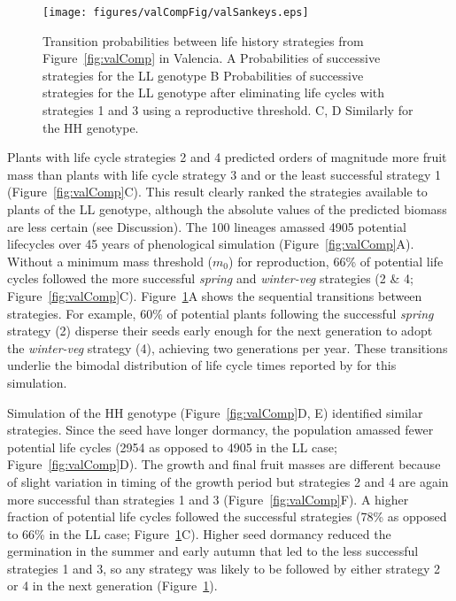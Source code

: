 \begin{figure}[tb]
\texttt{[image: figures/valCompFig/valSankeys.eps]}
\caption{Transition probabilities between life history strategies from
  Figure~\ref{fig:valComp} in Valencia. A Probabilities of successive strategies
  for the LL genotype B Probabilities of successive strategies for the LL
  genotype after eliminating life cycles with strategies 1 and 3 using a
  reproductive threshold. C, D Similarly for the HH genotype.}
\label{fig:valSank}
\end{figure}

Plants with life cycle strategies 2 and 4 predicted orders of magnitude more
fruit mass than plants with life cycle strategy 3 and or the least successful
strategy 1 (Figure~\ref{fig:valComp}C). This result clearly ranked the
strategies available to plants of the LL genotype, although the absolute values
of the predicted biomass are less certain (see Discussion). The 100 lineages
amassed 4905 potential lifecycles over 45 years of phenological simulation
(Figure~\ref{fig:valComp}A). Without a minimum mass threshold ($m_0$) for
reproduction, 66\% of potential life cycles followed the more successful
\emph{spring} and \emph{winter-veg} strategies (2 \& 4;
Figure~\ref{fig:valComp}C). Figure~\ref{fig:valSank}A shows the sequential
transitions between strategies. For example, 60\% of potential plants following
the successful \emph{spring} strategy (2) disperse their seeds early enough for
the next generation to adopt the \emph{winter-veg} strategy (4), achieving two
generations per year. These transitions underlie the bimodal distribution of
life cycle times reported by \citet{burghardt_modeling_2015} for this
simulation.

Simulation of the HH genotype (Figure~\ref{fig:valComp}D, E) identified similar
strategies. Since the seed have longer dormancy, the population amassed
fewer potential life cycles (2954 as opposed to 4905 in the LL case;
Figure~\ref{fig:valComp}D). The growth and final fruit masses are different because of
slight variation in timing of the growth period but strategies 2 and 4
are again more successful than strategies 1 and 3 (Figure~\ref{fig:valComp}F). A higher
fraction of potential life cycles followed the successful strategies
(78\% as opposed to 66\% in the LL case; Figure~\ref{fig:valSank}C). Higher seed
dormancy reduced the germination in the summer and early autumn that led
to the less successful strategies 1 and 3, so any strategy was likely to
be followed by either strategy 2 or 4 in the next generation (Figure~\ref{fig:valSank}).

